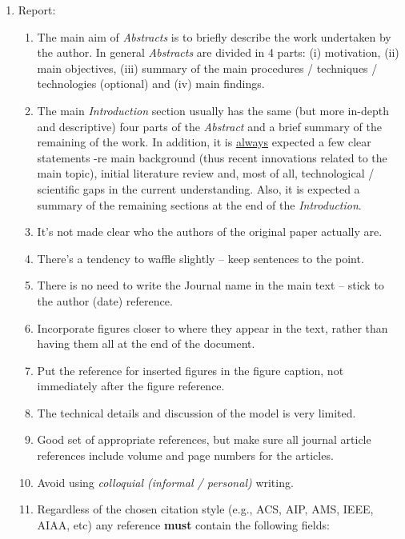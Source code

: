 \documentclass[14pt,twoside]{report}
\begin{document}
\begin{enumerate}

\item Report:
\begin{enumerate}
%
\item The main aim of {\it Abstracts} is to briefly describe the work undertaken by the author. In general {\it Abstracts} are divided in 4 parts: (i) motivation, (ii) main objectives, (iii) summary of the main procedures / techniques / technologies (optional) and (iv) main findings. 
%
\item The main {\it Introduction} section usually has the same (but more in-depth and descriptive) four parts of the {\it Abstract} and a brief summary of the remaining of the work. In addition, it is \underline{always} expected a few clear statements -re main background (thus recent innovations related to the main topic), initial literature review and, most of all, technological / scientific gaps in the current understanding. Also, it is expected a summary of the remaining sections at the end of the {\it Introduction}.
%
\item It's not made clear who the authors of the original paper actually are.
%
\item There's a tendency to waffle slightly -- keep sentences to the point.
%
\item There is no need to write the Journal name in the main text -- stick to the author (date) reference.
%
\item Incorporate figures closer to where they appear in the text, rather than having them all at the end of the document.
%
\item Put the reference for inserted figures in the figure caption, not immediately after the figure reference.
%
\item The technical details and discussion of the model is very limited.
%
\item Good set of appropriate references, but make sure all journal article references include volume and page numbers for the articles.
%
%
\item Avoid using {\it colloquial (informal / personal)} writing.
%
\item Regardless of the chosen citation style (e.g., ACS, AIP, AMS, IEEE, AIAA, etc) any reference {\bf must} contain the following fields: 

\end{enumerate}
\end{enumerate}
\end{document}
